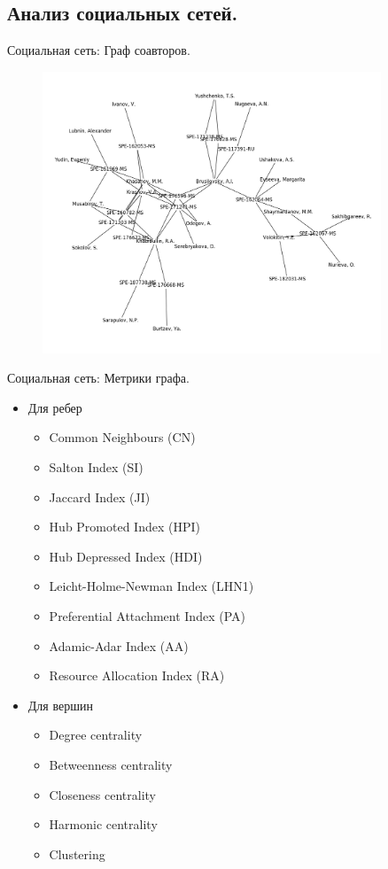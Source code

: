 \documentclass{beamer}
\begin{document}
\subsection{Анализ социальных сетей.}
\begin{frame}{Социальная сеть: Граф соавторов.}
	\begin{figure}
		\includegraphics[width=0.9\textwidth]{media/allo6eng.png}
	\end{figure}
\end{frame}

\begin{frame}{Социальная сеть: Метрики графа.}
	\begin{itemize}
		\item Для ребер
		\begin{itemize}
			\item Common Neighbours (CN)
			\item Salton Index (SI)
			\item Jaccard Index (JI)
			\item Hub Promoted Index (HPI)
			\item Hub Depressed Index (HDI)
			\item Leicht-Holme-Newman Index (LHN1)
			\item Preferential Attachment Index (PA)
			\item Adamic-Adar Index (AA)
			\item Resource Allocation Index (RA)
		\end{itemize}
		\item Для вершин 
		\begin{itemize}
			\item Degree centrality
			\item Betweenness centrality
			\item Closeness centrality
			\item Harmonic centrality
			\item Clustering
		\end{itemize}
	\end{itemize}
\end{frame}
\end{document}
